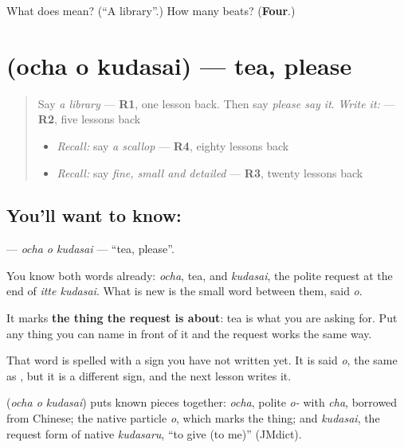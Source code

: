 \begin{tcolorbox}[breakable,colback=teal!4,colframe=teal!35!black,title={Before you move on}]
What does  mean? (\textquotedblleft{}A library\textquotedblright{}.) How many beats? (\textbf{Four}.)
\end{tcolorbox}
\section[\texorpdfstring{\ja{おちゃを} \ja{ください} (ocha o kudasai)}{おちゃを ください (ocha o kudasai)}]{  (ocha o kudasai) — tea, please}

\label{lesson:JA-C131-ocha-o-kudasai}



\begin{quote}
Say \emph{a library} — \textbf{R1}, one lesson back. Then say \emph{please say it}. \emph{Write it:} \textbf{} — \textbf{R2}, five lessons back

\begin{itemize}
\raggedright
  \item \emph{Recall:} say \emph{a scallop} — \textbf{R4}, eighty lessons back
  \item \emph{Recall:} say \emph{fine, small and detailed} — \textbf{R3}, twenty lessons back
\end{itemize}
\end{quote}

\subsection*{You'll want to know:  }
\textbf{ } — \emph{ocha o kudasai} — \textquotedblleft{}tea, please\textquotedblright{}.

You know both words already: \emph{ocha}, tea, and \emph{kudasai}, the polite request at the end of \emph{itte kudasai}. What is new is the small word between them, said \emph{o}.

It marks \textbf{the thing the request is about}: tea is what you are asking for. Put any thing you can name in front of it and the request works the same way.

That word is spelled with a sign you have not written yet. It is said \emph{o}, the same as \textbf{}, but it is a different sign, and the next lesson writes it.

\begin{cousinweb}
\textbf{ } (\emph{ocha o kudasai}) puts known pieces together: \emph{ocha}, polite \emph{o-} with \emph{cha}, borrowed from Chinese; the native particle \emph{o}, which marks the thing; and \emph{kudasai}, the request form of native \emph{kudasaru}, \textquotedblleft{}to give (to me)\textquotedblright{} (JMdict).
\end{cousinweb}

